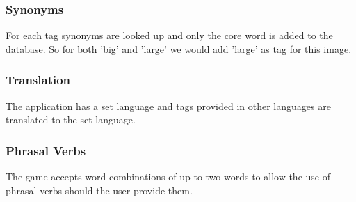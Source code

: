 \subsubsection{Synonyms}
\label{g14:sec:concepts:linguistics:synonyms}
For each tag synonyms are looked up and only the core word is added to the database. So for both 'big' and 'large' we would add 'large' as tag for this image.


\subsubsection{Translation}
\label{g14:sec:concepts:linguistics:translation}
The application has a set language and tags provided in other languages are translated to the set language.


\subsubsection{Phrasal Verbs}
\label{g14:sec:concepts:linguistics:phraselverbs}
The game accepts word combinations of up to two words to allow the use of phrasal verbs should the user provide them.

